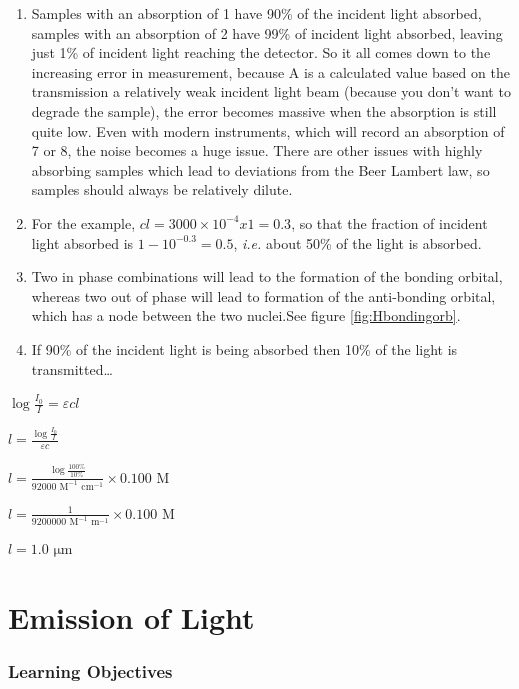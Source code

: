 \documentclass[
]{book}
\begin{document}
\begin{enumerate}
\def\labelenumi{\arabic{enumi}.}
\setcounter{enumi}{4}
\item
  Samples with an absorption of 1 have 90\% of the incident light absorbed, samples with an absorption of 2 have 99\% of incident light absorbed, leaving just 1\% of incident light reaching the detector. So it all comes down to the increasing error in measurement, because A is a calculated value based on the transmission a relatively weak incident light beam (because you don't want to degrade the sample), the error becomes massive when the absorption is still quite low. Even with modern instruments, which will record an absorption of 7 or 8, the noise becomes a huge issue. There are other issues with highly absorbing samples which lead to deviations from the Beer Lambert law, so samples should always be relatively dilute.
\item
  For the example, \(cl = 3000 \times 10^{-4} x 1 = 0.3\), so that the fraction of incident light absorbed is
  \(1 - 10^{-0.3} = 0.5\), \emph{i.e.} about 50\% of the light is absorbed.
\item
  Two in phase combinations will lead to the formation of the bonding orbital, whereas two out of phase will lead to formation of the anti-bonding orbital, which has a node between the two nuclei.See figure \ref{fig:Hbondingorb}.
\item
  If 90\% of the incident light is being absorbed then 10\% of the light is transmitted\ldots{}
\end{enumerate}

\(\log \frac{I_0}{I}=\varepsilon cl\)

\(l=\frac{ \log \frac{I_0}{I}}{\varepsilon c}\)

\(l=\frac{\log \frac{100 \%}{10 \%}}{92000 \textrm{ M}^{−1} \textrm{ cm}^{−1}} \times 0.100 \textrm{ M}\)

\(l=\frac{1}{9200000 \textrm{ M}^{−1} \textrm{ m}^{−1}} \times 0.100 \textrm{ M}\)

\(l = 1.0 \textrm{ μm}\)

\hypertarget{ch:Em}{%
\chapter{Emission of Light}\label{ch:Em}}

\hypertarget{sec:EmLOs}{%
\subsection{Learning Objectives}\label{sec:EmLOs}}
\end{document}
